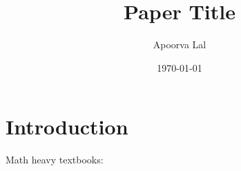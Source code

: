 

\usepackage{lipsum} %

\usepackage[
backend=biber,
style=authoryear,
citestyle=authoryear,
]{biblatex}



\title{Paper Title}

\author{Apoorva Lal}
\address{Stanford University, CA}



\date{\today}




\maketitle

\tableofcontents

\section{Introduction}

Math heavy textbooks:

